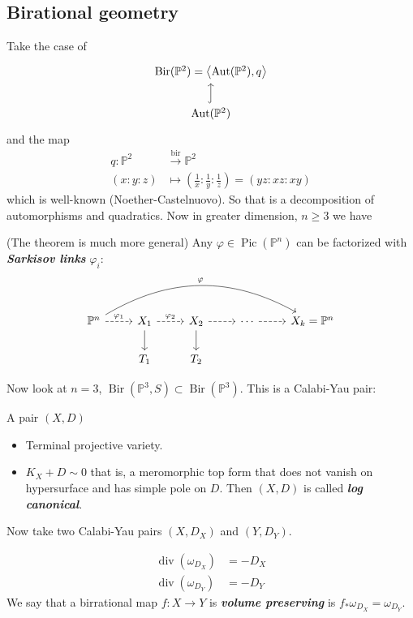\subsection{Birational geometry}

Take the case of
\[\begin{tikzcd}
	\operatorname{Bir}(\mathbb{P}^2)=\left<\operatorname{Aut}(\mathbb{P}^2),q\right> \\
	\operatorname{Aut}(\mathbb{P}^2)\arrow[u,hook]
\end{tikzcd}\]
and the map
\begin{align*}
	q: \mathbb{P}^2 &\overset{\operatorname{bir}}{\longrightarrow}\mathbb{P}^2  \\
	(x:y:z) &\longmapsto \left(\frac{1}{x}:\frac{1}{y}:\frac{1}{z}\right)=(yz:xz:xy)
\end{align*}
which is well-known (Noether-Castelnuovo). So that is a decomposition of automorphisms and quadratics. Now in greater dimension, $n\geq 3$ we have

\begin{thm}\leavevmode
	(The theorem is much more general) Any $\varphi \in\operatorname{Pic}(\mathbb{P}^n)$ can be factorized with  \textit{\textbf{Sarkisov links}}  $\varphi_i$:
	\[\begin{tikzcd}
		\mathbb{P}^n\arrow[r,dashed,"\varphi_1"]\arrow[rrrr,bend left,"\varphi"]&X_1\arrow[r,dashed,"\varphi_2"]\arrow[d]&X_2\arrow[r,dashed]\arrow[d]&\cdots \arrow[r,dashed]&X_k=\mathbb{P}^n\\
		&T_1&T_2
	\end{tikzcd}\]
\end{thm}

Now look at $n=3$, $\operatorname{Bir}(\mathbb{P}^3,S)\subset \operatorname{Bir}(\mathbb{P}^3)$. This is a Calabi-Yau pair:

\begin{defn}\leavevmode 
	A pair $(X,D)$
	\begin{itemize}
	\item Terminal projective variety.
	\item $K_X+D\sim0$ that is, a meromorphic top form that does not vanish on hypersurface and has simple pole on $D$. Then $(X,D)$ is called \textit{\textbf{log canonical}}.
	\end{itemize}

Now take two Calabi-Yau pairs $(X,D_X)$ and  $(Y,D_Y)$.

 \begin{align*}
	\operatorname{div}(\omega_{D_X})&=-D_X\\
	\operatorname{div}(\omega_{D_Y})&=-D_Y
\end{align*}
We say that a birrational map $f:X\to Y$ is \textit{\textbf{volume preserving}} is  $f_*\omega_{D_X}=\omega_{D_Y}$.

\end{defn}


